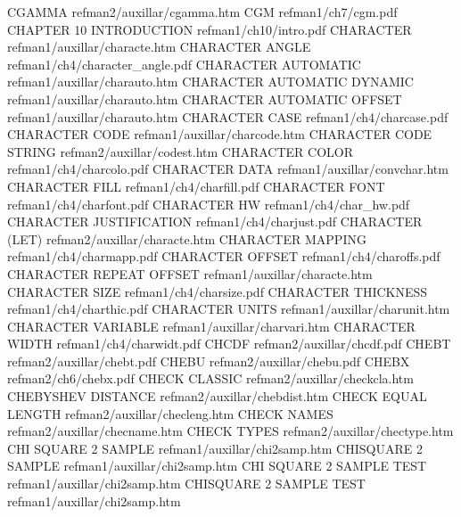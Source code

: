 CGAMMA                                  refman2/auxillar/cgamma.htm
CGM                                     refman1/ch7/cgm.pdf
CHAPTER 10 INTRODUCTION                 refman1/ch10/intro.pdf
CHARACTER                               refman1/auxillar/characte.htm
CHARACTER ANGLE                         refman1/ch4/character_angle.pdf
CHARACTER AUTOMATIC                     refman1/auxillar/charauto.htm
CHARACTER AUTOMATIC DYNAMIC             refman1/auxillar/charauto.htm
CHARACTER AUTOMATIC OFFSET              refman1/auxillar/charauto.htm
CHARACTER CASE                          refman1/ch4/charcase.pdf
CHARACTER CODE                          refman1/auxillar/charcode.htm
CHARACTER CODE STRING                   refman2/auxillar/codest.htm
CHARACTER COLOR                         refman1/ch4/charcolo.pdf
CHARACTER DATA                          refman1/auxillar/convchar.htm
CHARACTER FILL                          refman1/ch4/charfill.pdf
CHARACTER FONT                          refman1/ch4/charfont.pdf
CHARACTER HW                            refman1/ch4/char_hw.pdf
CHARACTER JUSTIFICATION                 refman1/ch4/charjust.pdf
CHARACTER (LET)                         refman2/auxillar/characte.htm
CHARACTER MAPPING                       refman1/ch4/charmapp.pdf
CHARACTER OFFSET                        refman1/ch4/charoffs.pdf
CHARACTER REPEAT OFFSET                 refman1/auxillar/characte.htm
CHARACTER SIZE                          refman1/ch4/charsize.pdf
CHARACTER THICKNESS                     refman1/ch4/charthic.pdf
CHARACTER UNITS                         refman1/auxillar/charunit.htm
CHARACTER VARIABLE                      refman1/auxillar/charvari.htm
CHARACTER WIDTH                         refman1/ch4/charwidt.pdf
CHCDF                                   refman2/auxillar/chcdf.pdf
CHEBT                                   refman2/auxillar/chebt.pdf
CHEBU                                   refman2/auxillar/chebu.pdf
CHEBX                                   refman2/ch6/chebx.pdf
CHECK CLASSIC                           refman2/auxillar/checkcla.htm
CHEBYSHEV DISTANCE                      refman2/auxillar/chebdist.htm
CHECK EQUAL LENGTH                      refman2/auxillar/checleng.htm
CHECK NAMES                             refman2/auxillar/checname.htm
CHECK TYPES                             refman2/auxillar/chectype.htm
CHI SQUARE 2 SAMPLE                     refman1/auxillar/chi2samp.htm
CHISQUARE 2 SAMPLE                      refman1/auxillar/chi2samp.htm
CHI SQUARE 2 SAMPLE TEST                refman1/auxillar/chi2samp.htm
CHISQUARE 2 SAMPLE TEST                 refman1/auxillar/chi2samp.htm
